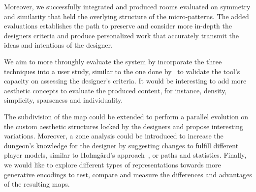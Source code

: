Moreover, we successfully integrated and produced rooms evaluated  on symmetry and similarity that held the overlying structure of the micro-patterns. The added evaluations establishes the path to preserve and consider more in-depth the designers criteria and produce personalized work that accurately transmit the ideas and intentions of the designer.


We aim to more throughly evaluate the system by incorporate the three techniques into a user study, similar to the one done by~ to validate the tool's capacity on assessing the designer's criteria. It would be interesting to add more aesthetic concepts to evaluate the produced content, for instance, density, simplicity, sparseness and individuality.


The subdivision of the map could be extended to perform a parallel evolution on the custom aesthetic structures locked by the designers and propose interesting variations. Moreover, a zone analysis could be introduced to increase the dungeon's knowledge for the designer by suggesting changes to fulfill different player models, similar to Holmg\r{a}rd's approach~, or paths and statistics. Finally, we would like to explore different types of representations towards more generative encodings to test, compare and measure the differences and advantages of the resulting maps.



